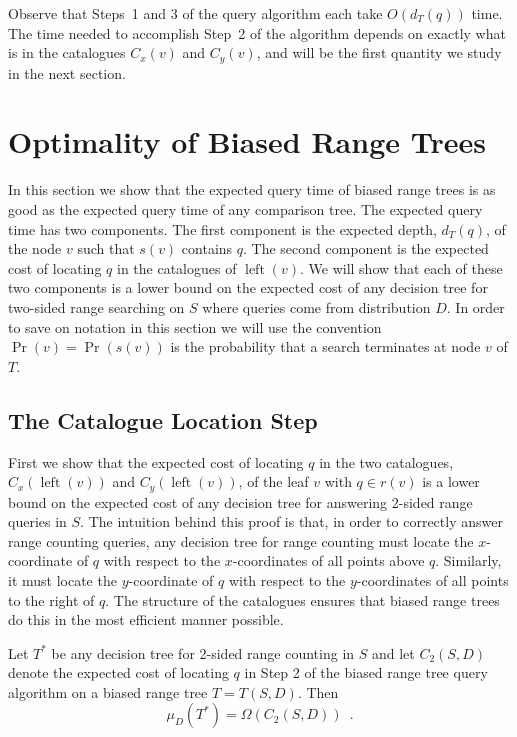 \documentclass[lotsofwhite,charterfonts]{patmorin}
\DeclareMathOperator{\lft}{left}
\begin{document}
Observe that Steps~1 and 3 of the query algorithm each take
$O(d_T(q))$ time.  The time needed to accomplish Step~2 of the
algorithm depends on exactly what is in the catalogues $C_x(v)$ and
$C_y(v)$, and will be the first quantity we study in the next section.

\section{Optimality of Biased Range Trees}

In this section we show that the expected query time of biased range
trees is as good as the expected query time of any comparison tree.
The expected query time has two components.  The first component is
the expected depth, $d_T(q)$,  of the node $v$ such that $s(v)$
contains $q$.  The second component is the expected cost of locating
$q$ in the catalogues of $\lft(v)$.  We will show that each of these two
components is a lower bound on the expected cost of any decision tree
for two-sided range searching on $S$ where queries come from
distribution $D$.  In order to save on notation in this section we
will use the convention $\Pr(v)=\Pr(s(v))$ is the probability that a
search terminates at node $v$ of $T$.

\subsection{The Catalogue Location Step}

First we show that the expected cost of locating $q$ in the two
catalogues, $C_x(\lft(v))$ and $C_y(\lft(v))$, of the leaf $v$
with $q\in r(v)$ is
a lower bound on the expected cost of any decision tree for answering
2-sided range queries in $S$.  The intuition behind this proof is
that, in order to correctly answer range counting queries, any decision tree
for range counting must locate the $x$-coordinate of $q$
with respect to the $x$-coordinates of all points above $q$.  
Similarly, it must locate the $y$-coordinate of $q$ with respect to
the $y$-coordinates of all points to the right of $q$.  The structure
of the catalogues ensures that biased range trees do this in the most
efficient manner possible.
 

\begin{lem}
Let $T^*$ be any decision tree for 2-sided range counting in $S$ and let
$C_2(S,D)$ denote the expected cost of locating $q$ in Step 2 of the
biased range tree query algorithm on a biased range tree $T=T(S,D)$. 
Then
\[
  \mu_D(T^*) = \Omega(C_2(S,D)) \enspace .
\] 
\end{lem}
\end{document}
